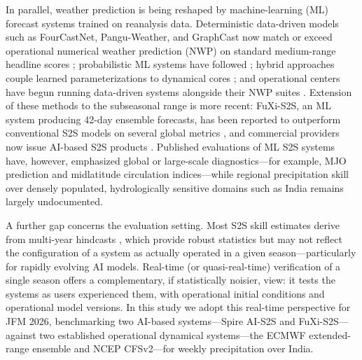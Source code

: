 \documentclass[11pt]{article}
\begin{document}
In parallel, weather prediction is being reshaped by machine-learning
(ML) forecast systems trained on reanalysis data. Deterministic
data-driven models such as FourCastNet, Pangu-Weather, and GraphCast
now match or exceed operational numerical weather prediction (NWP) on
standard medium-range headline scores
\citep{pathak2022,bi2023,lam2023,benbouallegue2024,rasp2024};
probabilistic ML systems have followed \citep{price2025}; hybrid
approaches couple learned parameterizations to dynamical cores
\citep{kochkov2024}; and operational centers have begun running
data-driven systems alongside their NWP suites \citep{lang2024}.
Extension of these methods to the subseasonal range is more recent:
FuXi-S2S, an ML system producing 42-day ensemble forecasts, has been
reported to outperform conventional S2S models on several global
metrics \citep{chen2024}, and commercial providers now issue AI-based
S2S products \citep{spire2026}. Published evaluations of ML S2S
systems have, however, emphasized global or large-scale
diagnostics---for example, MJO prediction and midlatitude circulation
indices---while regional precipitation skill over densely populated,
hydrologically sensitive domains such as India remains largely
undocumented.

A further gap concerns the evaluation setting. Most S2S skill
estimates derive from multi-year hindcasts
\citep{deandrade2019,pegion2019}, which provide robust statistics but
may not reflect the configuration of a system as actually operated in a
given season---particularly for rapidly evolving AI models. Real-time
(or quasi-real-time) verification of a single season offers a
complementary, if statistically noisier, view: it tests the systems as
users experienced them, with operational initial conditions and
operational model versions. In this study we adopt this real-time
perspective for JFM 2026, benchmarking two AI-based systems---Spire
AI-S2S and FuXi-S2S---against two established operational dynamical
systems---the ECMWF extended-range ensemble and NCEP CFSv2---for weekly
precipitation over India.
\end{document}

